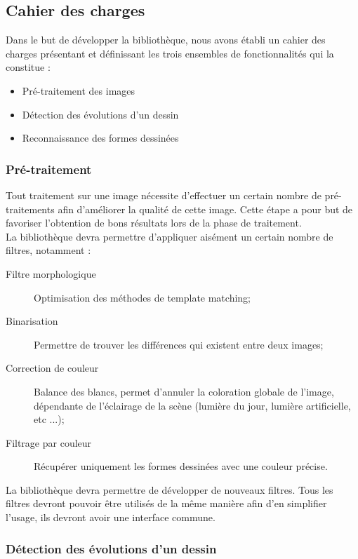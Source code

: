 \subsection{Cahier des charges}

Dans le but de développer la bibliothèque, nous avons établi un cahier des charges présentant et définissant les trois ensembles de fonctionnalités qui la constitue :
\begin{itemize}
\item Pré-traitement des images
\item Détection des évolutions d'un dessin
\item Reconnaissance des formes dessinées
\end{itemize}

\subsubsection{Pré-traitement}

Tout traitement sur une image nécessite d'effectuer un certain nombre de pré-traitements afin d'améliorer la qualité de cette image. Cette étape a pour but de favoriser l'obtention de bons résultats lors de la phase de traitement.\\

La bibliothèque devra permettre d'appliquer aisément un certain nombre de filtres, notamment :

\begin{description}
\item[Filtre morphologique] Optimisation des méthodes de template matching;
\item[Binarisation] Permettre de trouver les différences qui existent entre deux images;
\item[Correction de couleur] Balance des blancs, permet d'annuler la coloration globale de l'image, dépendante de l'éclairage de la scène (lumière du jour, lumière artificielle, etc ...);
\item[Filtrage par couleur] Récupérer uniquement les formes dessinées avec une couleur précise.
\end{description}

La bibliothèque devra permettre de développer de nouveaux filtres. Tous les filtres devront pouvoir être utilisés de la même manière afin d'en simplifier l'usage, ils devront avoir une interface commune.

\clearpage
\subsubsection{Détection des évolutions d'un dessin}

